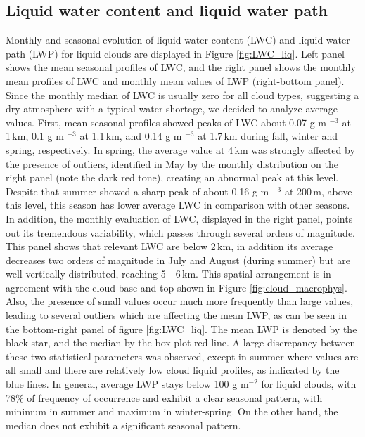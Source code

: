 \documentclass[journal abbreviation, manuscript]{copernicus}
\begin{document}
\subsection{Liquid water content and liquid water path}

Monthly and seasonal evolution of liquid water content (LWC) and liquid water path (LWP) for liquid clouds are displayed in Figure \ref{fig:LWC_liq}. Left panel shows the mean seasonal profiles of LWC, and the right panel shows the monthly mean profiles of LWC and monthly mean values of LWP (right-bottom panel). Since the monthly median of LWC is usually zero for all cloud types, suggesting a dry atmosphere with a typical water shortage, we decided to analyze average values. 
First, mean seasonal profiles showed peaks of LWC about 0.07 g m $^{-3}$ at 1\,km, 0.1 g m $^{-3}$ at 1.1\,km, and 0.14 g m $^{-3}$ at 1.7\,km during fall, winter and spring, respectively.  
In spring, the average value at 4\,km was strongly affected by the presence of outliers, identified in May by the monthly distribution on the right panel (note the dark red tone), creating an abnormal peak at this level.
Despite that summer showed a sharp peak of about 0.16 g m $^{-3}$ at 200\,m, above this level, this season has lower average LWC in comparison with other seasons. 
In addition, the monthly evaluation of LWC, displayed in the right panel, points out its tremendous variability, which passes through several orders of magnitude. This panel shows that relevant LWC are below 2\,km, in addition its average decreases two orders of magnitude in July and August (during summer) but are well vertically distributed, reaching 5 - 6\,km. This spatial arrangement is in agreement with the cloud base and top shown in Figure \ref{fig:cloud_macrophys}. Also, the presence of small values occur much more frequently than large values, leading to several outliers which are affecting the mean LWP, as can be seen in the bottom-right panel of figure \ref{fig:LWC_liq}. The mean LWP is denoted by the black star, and the median by the box-plot red line. A large discrepancy between these two statistical parameters was observed, except in summer where values are all small and there are relatively low cloud liquid profiles, as indicated by the blue lines. In general, average LWP stays below 100 g m$^{-2}$ for liquid clouds, with 78\% of frequency of occurrence and exhibit a clear seasonal pattern, with minimum in summer and maximum in winter-spring. On the other hand, the median does not exhibit a significant seasonal pattern. 
\end{document}
